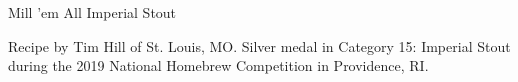 \begin{recipe}{Mill 'em All Imperial Stout} %

\begin{aboutblock}
Recipe by Tim Hill of St. Louis, MO. Silver medal in Category 15: Imperial Stout
during the 2019 National Homebrew Competition in Providence, RI. \sourceaha
\end{aboutblock}


\begin{methodandtiming}
 
\begin{mashsteps}
\end{mashsteps}

\begin{fermentationsteps}
\end{fermentationsteps}

\end{methodandtiming}

\recipebreak

\begin{ingredientsblock}

\begin{malts}
\end{malts}

\begin{hops}
\end{hops}


\end{ingredientsblock}

\end{recipe}

